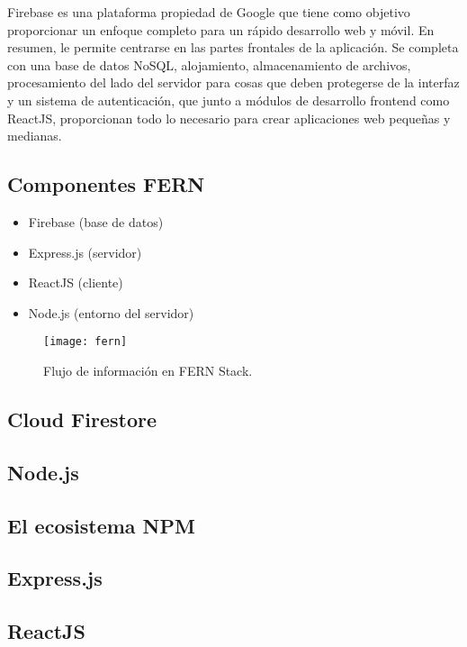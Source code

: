 Firebase es una plataforma propiedad de Google que tiene como objetivo proporcionar un enfoque completo para un rápido desarrollo web y móvil. En resumen, le permite centrarse en las partes frontales de la aplicación. Se completa con una base de datos NoSQL, alojamiento, almacenamiento de archivos, procesamiento del lado del servidor para cosas que deben protegerse de la interfaz y un sistema de autenticación, que junto a módulos de desarrollo \gls{frontend} como ReactJS, proporcionan todo lo necesario para crear aplicaciones web pequeñas y medianas.
\vspace{0.8cm}

\subsection{Componentes FERN}
\begin{itemize}
  \item Firebase (base de datos)
  \item Express.js (servidor)
  \item ReactJS (cliente)
  \item Node.js (entorno del servidor)
\end{itemize}
\begin{figure}[H]
  \centering
  \texttt{[image: fern]}
  \caption{Flujo de información en FERN Stack.}
\end{figure}

\subsection{Cloud Firestore}


\subsection{Node.js}


\subsection{El ecosistema NPM}


\subsection{Express.js}


\subsection{ReactJS}

